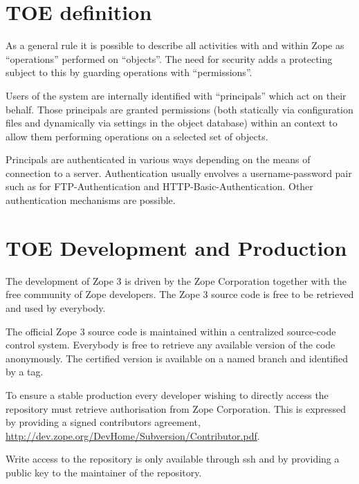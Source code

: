 \documentclass[12pt,english]{scrbook}
\begin{document}



\section{TOE definition}

As a general rule it is possible to describe all activities with and within Zope as
``operations'' performed on ``objects''. The need for security adds a protecting
subject to this by guarding operations with ``permissions''.

Users of the system are internally identified with ``principals'' which act on
their behalf.  Those principals are granted permissions (both statically via
configuration files and dynamically via settings in the object database) within
an context to allow them performing operations on a selected set of objects.

Principals are authenticated in various ways depending on the means of
connection to a server.  Authentication usually envolves a username-password
pair such as for FTP-Authentication and HTTP-Basic-Authentication.  Other
authentication mechanisms are possible.





\section{TOE Development and Production}

The development of Zope 3 is driven by the Zope Corporation together with the
free community of Zope developers. The Zope 3 source code is free to be
retrieved and used by everybody.

The official Zope 3 source code is maintained within a centralized source-code
control system.  Everybody is free to retrieve any available version of the
code anonymously. The certified version is available on a named branch and
identified by a tag.

To ensure a stable production every developer wishing to directly access the
repository must retrieve authorisation from Zope Corporation. This is
expressed by providing a signed contributors agreement,
\url{http://dev.zope.org/DevHome/Subversion/Contributor.pdf}.

Write access to the repository is only available through ssh and by providing
a public key to the maintainer of the repository.
\end{document}
